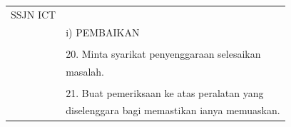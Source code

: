 \documentclass[
]{article}
\begin{document}
\begin{longtable}[]{@{}ll@{}}
\begin{minipage}[t]{0.23\columnwidth}
SSJN ICT\strut
\end{minipage} & \begin{minipage}[t]{0.71\columnwidth}\raggedright
\strut
\end{minipage}\tabularnewline
\begin{minipage}[t]{0.23\columnwidth}\raggedright
\strut
\end{minipage} & \begin{minipage}[t]{0.71\columnwidth}\raggedright
i) PEMBAIKAN\strut
\end{minipage}\tabularnewline
\begin{minipage}[t]{0.23\columnwidth}\raggedright
\strut
\end{minipage} & \begin{minipage}[t]{0.71\columnwidth}\raggedright
\strut
\end{minipage}\tabularnewline
\begin{minipage}[t]{0.23\columnwidth}\raggedright
\strut
\end{minipage} & \begin{minipage}[t]{0.71\columnwidth}\raggedright
20. Minta syarikat penyenggaraan selesaikan\strut
\end{minipage}\tabularnewline
\begin{minipage}[t]{0.23\columnwidth}\raggedright
\strut
\end{minipage} & \begin{minipage}[t]{0.71\columnwidth}\raggedright
masalah.\strut
\end{minipage}\tabularnewline
\begin{minipage}[t]{0.23\columnwidth}\raggedright
\strut
\end{minipage} & \begin{minipage}[t]{0.71\columnwidth}\raggedright
\strut
\end{minipage}\tabularnewline
\begin{minipage}[t]{0.23\columnwidth}\raggedright
\strut
\end{minipage} & \begin{minipage}[t]{0.71\columnwidth}\raggedright
21. Buat pemeriksaan ke atas peralatan yang\strut
\end{minipage}\tabularnewline
\begin{minipage}[t]{0.23\columnwidth}\raggedright
\strut
\end{minipage} & \begin{minipage}[t]{0.71\columnwidth}\raggedright
diselenggara bagi memastikan ianya memuaskan.\strut
\end{minipage}\tabularnewline

\end{longtable}
\end{document}
